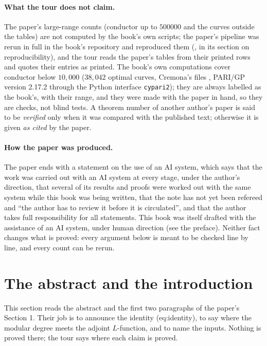 \begin{sloppypar}
\paragraph{What the tour does not claim.} The paper's large-range counts (conductor up to $500000$ and the curves outside the tables) are not
computed by the book's own scripts; the paper's pipeline was rerun in full in the book's repository and reproduced them (, in its
section on reproducibility), and the tour reads the paper's tables from their printed rows and quotes their entries as printed. The book's own computations cover conductor below $10{,}000$ ($38{,}042$ optimal curves,
Cremona's files \cite{ecdata}, PARI/GP \cite{PARI} version 2.17.2 through the Python interface \texttt{cypari2}); they are always labelled as the book's, with their
range, and they were made with the paper in hand, so they are checks, not blind tests. A theorem number of another author's paper is said to be \emph{verified}
only when it was compared with the published text; otherwise it is given \emph{as cited} by the paper.

\paragraph{How the paper was produced.} The paper ends with a statement on the use of an AI system, which says that the work was carried out
with an AI system at every stage, under the author's direction, that several of its results and proofs were worked out with the same system while this book
was being written, that the note has not yet been refereed and ``the author has to review it before it is circulated'', and that the author takes full
responsibility for all statements. This book was itself drafted with the assistance of an AI system, under human direction (see the preface). Neither fact
changes what is proved: every argument below is meant to be checked line by line, and every count can be rerun.

\section{The abstract and the introduction}\label{sec:paper:intro}

This section reads the abstract and the first two paragraphs of the paper's Section 1. Their job is to announce the identity (eq:identity), to say
where the modular degree meets the adjoint $L$-function, and to name the inputs. Nothing is proved there; the tour says where each claim is proved.


\end{sloppypar}
